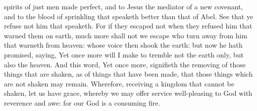 spirits of just men made perfect, and to Jesus the mediator of a new covenant, and to the blood of sprinkling that speaketh better than that of Abel. See that ye refuse not him that speaketh. For if they escaped not when they refused him that warned them on earth, much more shall not we escape who turn away from him that warneth from heaven: whose voice then shook the earth: but now he hath promised, saying, Yet once more will I make to tremble not the earth only, but also the heaven. And this word, Yet once more, signifieth the removing of those things that are shaken, as of things that have been made, that those things which are not shaken may remain. Wherefore, receiving a kingdom that cannot be shaken, let us have grace, whereby we may offer service well-pleasing to God with reverence and awe: for our God is a consuming fire. 

